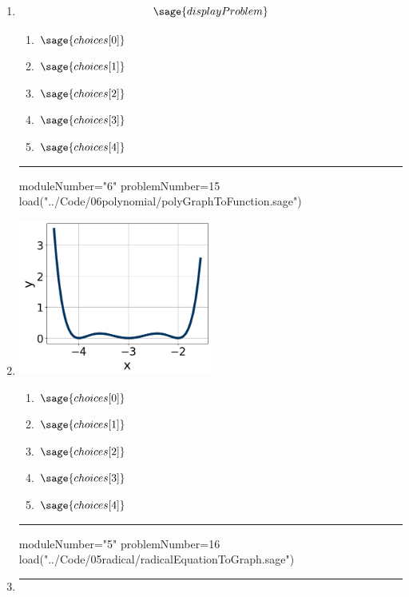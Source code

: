 \documentclass[14pt]{extbook}
\newcommand{\litem}[1]{\item#1\hspace*{-1cm}\rule{\textwidth}{0.4pt}}
\begin{document}
\begin{enumerate}
\litem{ 

   \[ \sage{displayProblem} \]

  	\begin{enumerate}[label=\Alph*.]
    \item \( \sage{choices[0]} \)
    \item \( \sage{choices[1]} \)
    \item \( \sage{choices[2]} \)
    \item \( \sage{choices[3]} \)
    \item \( \sage{choices[4]} \)
  	\end{enumerate}
  }

  \begin{sagesilent}
  moduleNumber="6"
  problemNumber=15
  load("../Code/06polynomial/polyGraphToFunction.sage")
  \end{sagesilent}

  \litem{ 

   \begin{center}
       \includegraphics[width=0.5\textwidth]{../Figures/polyGraphToFunctionA.png}
   \end{center}

  	\begin{enumerate}[label=\Alph*.]
    \item \( \sage{choices[0]} \)
    \item \( \sage{choices[1]} \)
    \item \( \sage{choices[2]} \)
    \item \( \sage{choices[3]} \)
    \item \( \sage{choices[4]} \)
  	\end{enumerate}
  }

\begin{sagesilent}
moduleNumber="5"
problemNumber=16
load("../Code/05radical/radicalEquationToGraph.sage")
\end{sagesilent}

\litem{ 

}
\end{enumerate}
\end{document}
